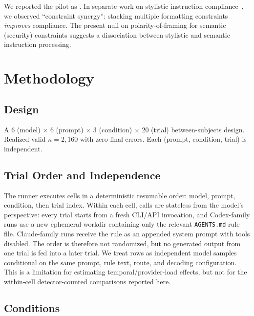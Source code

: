 \documentclass[11pt,a4paper]{article}
\begin{document}
We reported the pilot as \citet{rajasekaran2026dontsaynever}. In separate work on stylistic instruction compliance~\citep{rajasekaran2026aesthetic}, we observed ``constraint synergy'': stacking multiple formatting constraints \emph{improves} compliance. The present null on polarity-of-framing for semantic (security) constraints suggests a dissociation between stylistic and semantic instruction processing.

\section{Methodology}
\label{sec:methodology}

\subsection{Design}

A 6 (model) $\times$ 6 (prompt) $\times$ 3 (condition) $\times$ 20 (trial) between-subjects design. Realized valid $n = 2{,}160$ with zero final errors. Each (prompt, condition, trial) is independent.

\subsection{Trial Order and Independence}

The runner executes cells in a deterministic resumable order: model, prompt, condition, then trial index. Within each cell, calls are stateless from the model's perspective: every trial starts from a fresh CLI/API invocation, and Codex-family runs use a new ephemeral workdir containing only the relevant \texttt{AGENTS.md} rule file. Claude-family runs receive the rule as an appended system prompt with tools disabled. The order is therefore not randomized, but no generated output from one trial is fed into a later trial. We treat rows as independent model samples conditional on the same prompt, rule text, route, and decoding configuration. This is a limitation for estimating temporal/provider-load effects, but not for the within-cell detector-counted comparisons reported here.

\subsection{Conditions}
\end{document}
